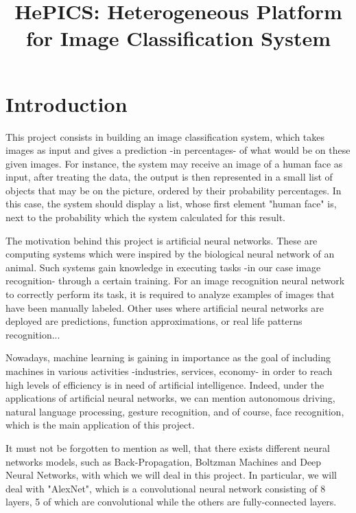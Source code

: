 \documentclass[parskip=full]{scrartcl}
\title{HePICS: Heterogeneous Platform for Image Classification System}
\begin{document}
\maketitle
\thispagestyle{empty}
\pagebreak





\tableofcontents
\pagebreak





\section {Introduction}

This project consists in building an image classification system, which takes images as input and gives a prediction -in percentages- of what would be on these given images. For instance, the system may receive an image of a human face as input, after treating the data, the output is then represented in a small list of objects that may be on the picture, ordered by their probability percentages. In this case, the system should display a list, whose first element "human face" is, next to the probability which the system calculated for this result.

The motivation behind this project is artificial neural networks. These are computing systems which were inspired by the biological neural network of an animal. Such systems gain knowledge in executing tasks -in our case image recognition- through a certain training. For an image recognition neural network to correctly perform its task, it is required to analyze examples of images that have been manually labeled. Other uses where artificial neural networks are deployed are predictions, function approximations, or real life patterns recognition...

Nowadays, machine learning is gaining in importance as the goal of including machines in various activities -industries, services, economy- in order to reach high levels of efficiency is in need of artificial intelligence. Indeed, under the applications of artificial neural networks, we can mention autonomous driving, natural language processing, gesture recognition, and of course, face recognition, which is the main application of this project.

It must not be forgotten to mention as well, that there exists different neural networks models, such as Back-Propagation, Boltzman Machines and Deep Neural Networks, with which we will deal in this project. In particular, we will deal with "AlexNet", which is a convolutional neural network consisting of 8 layers, 5 of which are convolutional while the others are fully-connected layers.
\end{document}

